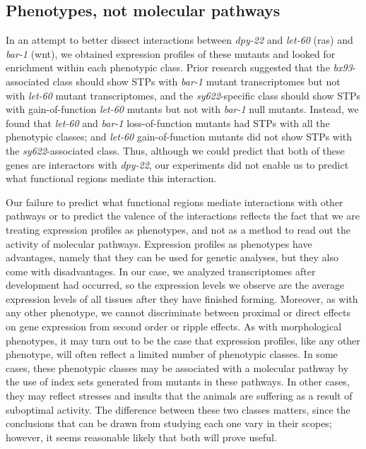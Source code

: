 \documentclass[9pt,twocolumn,twoside]{gsajnl}
\newcommand{\gene}[1]{\mbox{\emph{#1}}}
\newcommand{\dpy}[1]{\gene{dpy-22#1}}
\begin{document}
\subsection*{Phenotypes, not molecular pathways}
In an attempt to better dissect interactions between \dpy{} and \gene{let-60}
(ras) and \gene{bar-1} (wnt), we obtained expression profiles of these mutants
and looked for enrichment within each phenotypic class. Prior research suggested
that the \emph{bx93}-associated class should show STPs with \gene{bar-1} mutant
transcriptomes but not with \gene{let-60} mutant transcriptomes, and the
\emph{sy622}-specific class should show STPs with gain-of-function \gene{let-60}
mutants but not with \gene{bar-1} null mutants. Instead, we found that
\gene{let-60} and \gene{bar-1} loss-of-function mutants had STPs with all the
phenotypic classes; and \gene{let-60} gain-of-function mutants did not show STPs
with the \emph{sy622}-associated class. Thus, although we could predict that
both of these genes are interactors with \dpy{}, our experiments did not enable
us to predict what functional regions mediate this interaction.

Our failure to predict what functional regions mediate interactions with other
pathways or to predict the valence of the interactions reflects the fact that we
are treating expression profiles as phenotypes, and not as a method to read out
the activity of molecular pathways. Expression profiles as phenotypes have
advantages, namely that they can be used for genetic analyses, but they also
come with disadvantages. In our case, we analyzed transcriptomes after
development had occurred, so the expression levels we observe are the average
expression levels of all tissues after they have finished forming. Moreover, as
with any other phenotype, we cannot discriminate between proximal or direct
effects on gene expression from second order or ripple effects. As with
morphological phenotypes, it may turn out to be the case that expression
profiles, like any other phenotype, will often reflect a limited number of
phenotypic classes. In some cases, these phenotypic classes may be associated
with a molecular pathway by the use of index sets generated from mutants in
these pathways. In other cases, they may reflect stresses and insults that the
animals are suffering as a result of suboptimal activity. The difference between
these two classes matters, since the conclusions that can be drawn from studying
each one vary in their scopes; however, it seems reasonable likely that both
will prove useful.
\end{document}
